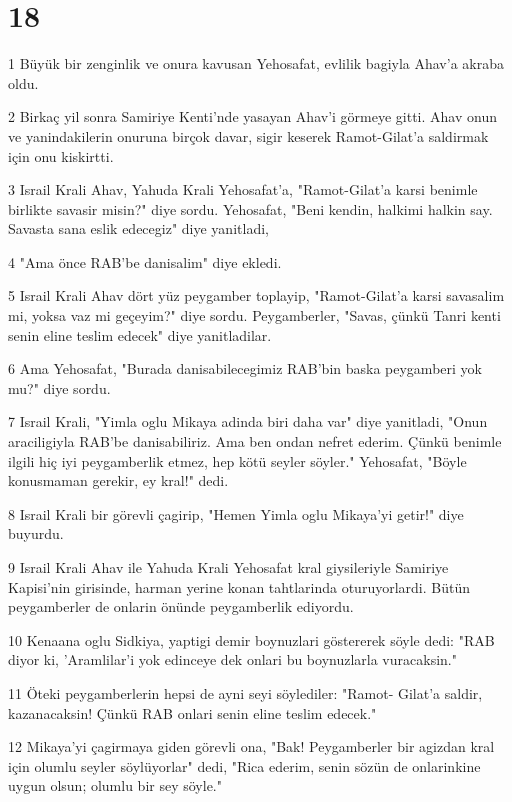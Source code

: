 \chapter{18}

\par 1 Büyük bir zenginlik ve onura kavusan Yehosafat, evlilik bagiyla Ahav'a akraba oldu.
\par 2 Birkaç yil sonra Samiriye Kenti'nde yasayan Ahav'i görmeye gitti. Ahav onun ve yanindakilerin onuruna birçok davar, sigir keserek Ramot-Gilat'a saldirmak için onu kiskirtti.
\par 3 Israil Krali Ahav, Yahuda Krali Yehosafat'a, "Ramot-Gilat'a karsi benimle birlikte savasir misin?" diye sordu. Yehosafat, "Beni kendin, halkimi halkin say. Savasta sana eslik edecegiz" diye yanitladi,
\par 4 "Ama önce RAB'be danisalim" diye ekledi.
\par 5 Israil Krali Ahav dört yüz peygamber toplayip, "Ramot-Gilat'a karsi savasalim mi, yoksa vaz mi geçeyim?" diye sordu. Peygamberler, "Savas, çünkü Tanri kenti senin eline teslim edecek" diye yanitladilar.
\par 6 Ama Yehosafat, "Burada danisabilecegimiz RAB'bin baska peygamberi yok mu?" diye sordu.
\par 7 Israil Krali, "Yimla oglu Mikaya adinda biri daha var" diye yanitladi, "Onun araciligiyla RAB'be danisabiliriz. Ama ben ondan nefret ederim. Çünkü benimle ilgili hiç iyi peygamberlik etmez, hep kötü seyler söyler." Yehosafat, "Böyle konusmaman gerekir, ey kral!" dedi.
\par 8 Israil Krali bir görevli çagirip, "Hemen Yimla oglu Mikaya'yi getir!" diye buyurdu.
\par 9 Israil Krali Ahav ile Yahuda Krali Yehosafat kral giysileriyle Samiriye Kapisi'nin girisinde, harman yerine konan tahtlarinda oturuyorlardi. Bütün peygamberler de onlarin önünde peygamberlik ediyordu.
\par 10 Kenaana oglu Sidkiya, yaptigi demir boynuzlari göstererek söyle dedi: "RAB diyor ki, 'Aramlilar'i yok edinceye dek onlari bu boynuzlarla vuracaksin."
\par 11 Öteki peygamberlerin hepsi de ayni seyi söylediler: "Ramot- Gilat'a saldir, kazanacaksin! Çünkü RAB onlari senin eline teslim edecek."
\par 12 Mikaya'yi çagirmaya giden görevli ona, "Bak! Peygamberler bir agizdan kral için olumlu seyler söylüyorlar" dedi, "Rica ederim, senin sözün de onlarinkine uygun olsun; olumlu bir sey söyle."
